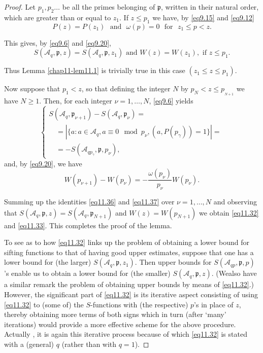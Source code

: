 \begin{proof}%
Let $p_1, p_2 \ldots$ be all the primes belonging of $\mathfrak{p}$,
written in their natural order, which are greater than or equal to
$z_1$. If $z \le p_1$ we have, by \eqref{eq9.15} and \eqref{eq9.12} 
\begin{equation*}
P(z) = P(z_1)  \text{~ and~ } \omega(p) = 0 \text{~ for~ } z_1 \le p<
z.\tag{11.34}\label{eq11.34}  
\end{equation*}

This gives, by \eqref{eq9.6} and \eqref{eq9.20}, 
\begin{equation*}
 S (\mathscr{A}_q, \mathfrak{p}, z )  = S (\mathscr{A}_q,
 \mathfrak{p}, z_1) \text{ and } W(z) = W(z_1), \text{ if } z \le
 p_1.\tag{11.35}\label{eq11.35}  
\end{equation*}

Thus Lemma \ref{chap11-lem11.1} is trivially true in this case $(z_1
\le z \le p_1)$.  

Now suppose that $p_1 < z$, so that defining the integer $N$ by $p_N <
z \le p_{_{N+1}}$ we have $N \ge 1$. Then, for each integer $\nu
=1,\ldots,N$, \eqref{eq9.6} yields 
\begin{equation*}
\begin{cases}
 S (\mathscr{A}_q, \mathfrak{p}_{\nu+1})  - S (\mathscr{A}_q,
 \mathfrak{p}_\nu)= \\ 
\quad = |\{a : a \in \mathscr{A}_q, a \equiv 0 \mod p_{\nu}, (a,
P(p_\gamma)) = 1\}|=\\ 
\quad = - S (\mathscr{A}_{qp_\gamma}, \mathfrak{p},p_\nu),
\end{cases}\tag{11.36}\label{eq11.36}
\end{equation*}
and, by \eqref{eq9.20}, we have
\begin{equation*}
W (p_{\nu +1}) - W (p_\nu) = - \frac{\omega(p_\nu)} {p_\nu}
W(p_\nu).\tag{11.37}\label{eq11.37} 
\end{equation*}

Summing up the identities \eqref{eq11.36} and \eqref{eq11.37} over $\nu =
1,\ldots, N$ and observing that $S(\mathscr{A}_q, \mathfrak{p}, z )
= S (\mathscr{A}_q, \mathfrak{p}_{N+1})$ and $W(z) = W(p_{N+1})$ we
obtain \eqref{eq11.32} and \eqref{eq11.33}. This completes the proof
of the lemma. 

To see as to how \eqref{eq11.32} links up the problem of obtaining a lower
bound for sifting functions to that of having good upper estimates,
suppose that one has a  lower bound for (the larger)  $S(\mathscr{A}_q,
\mathfrak{p}, z_1)$. Then upper bounds for $S(\mathscr{A}_{qp},
\mathfrak{p}, p)$'s enable us to obtain a lower bound for (the
smaller) $S(\mathscr{A}_{q}, \mathfrak{p}, z)$. (We\pageoriginale also have a
similar remark the problem of obtaining upper bounds by means of
\eqref{eq11.32}.) However, the significant part of \eqref{eq11.32} is its
iterative  aspect consisting of using \eqref{eq11.32} to (some of) the
$S$-functions with (the respective) $p$'s in place of $z$, thereby
obtaining more terms of both signs which in turn (after `many'
iterations) would provide a more effective scheme for the above
procedure. Actually , it is again  this iterative process because of
which \eqref{eq11.32} is stated with a (general) $q$ (rather than with $q =
1$).  


\end{proof}
